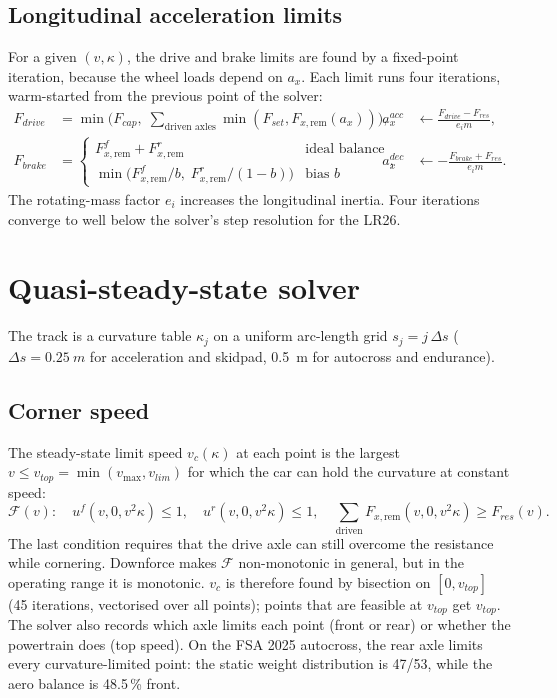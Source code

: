 \documentclass[11pt]{article}
\begin{document}
\subsection{Longitudinal acceleration limits}
For a given $(v,\kappa)$, the drive and brake limits are found by a fixed-point iteration, because the wheel loads
depend on $a_x$. Each limit runs four iterations, warm-started from the previous point of the solver:
\begin{align}
F_{drive} &= \min\!\Big(F_{cap},\;\textstyle\sum_{\text{driven axles}} \min(F_{set}, F_{x,\mathrm{rem}}(a_x))\Big), &
a_x^{acc} &\leftarrow \frac{F_{drive} - F_{res}}{e_i m}, \label{eq:axacc}\\
F_{brake} &= \begin{cases} F_{x,\mathrm{rem}}^f + F_{x,\mathrm{rem}}^r & \text{ideal balance}\\
\min\!\big(F_{x,\mathrm{rem}}^f/b,\; F_{x,\mathrm{rem}}^r/(1-b)\big) & \text{bias } b\end{cases}, &
a_x^{dec} &\leftarrow -\frac{F_{brake} + F_{res}}{e_i m}. \label{eq:axdec}
\end{align}
The rotating-mass factor $e_i$ increases the longitudinal inertia. Four iterations converge to well below the
solver's step resolution for the LR26.

\section{Quasi-steady-state solver}\label{sec:solver}
The track is a curvature table $\kappa_j$ on a uniform arc-length grid $s_j = j\,\Delta s$ ($\Delta s =
\SI{0.25}{m}$ for acceleration and skidpad, \SI{0.5}{m} for autocross and endurance).

\subsection{Corner speed}
The steady-state limit speed $v_c(\kappa)$ at each point is the largest $v\le v_{top}=\min(v_{\max}, v_{lim})$
for which the car can hold the curvature at constant speed:
\begin{equation}
\mathcal{F}(v): \quad u^f(v,0,v^2\kappa)\le 1,\quad u^r(v,0,v^2\kappa)\le 1,\quad
\sum_{\text{driven}} F_{x,\mathrm{rem}}(v,0,v^2\kappa) \ge F_{res}(v).
\end{equation}
The last condition requires that the drive axle can still overcome the resistance while cornering. Downforce makes
$\mathcal{F}$ non-monotonic in general, but in the operating range it is monotonic. $v_c$ is therefore found by
bisection on $[0, v_{top}]$ (45 iterations, vectorised over all points); points that are feasible at $v_{top}$
get $v_{top}$. The solver also records which axle limits each point (front or rear) or whether the powertrain does
(top speed). On the FSA 2025 autocross, the rear axle limits every curvature-limited point: the static weight
distribution is 47/53, while the aero balance is 48.5\,\% front.
\end{document}
